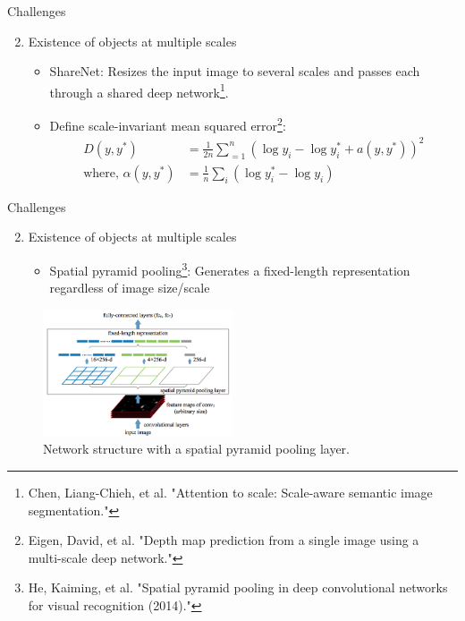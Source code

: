 \documentclass{beamer}
\begin{document}
\begin{frame}{Challenges}
\begin{enumerate}
	\setcounter{enumi}{1}
	\item {\color{blue}Existence of objects at multiple scales}
\begin{itemize}
	\item{ShareNet: Resizes the input image to several scales and passes each through a shared deep network\footnote{Chen, Liang-Chieh, et al. "Attention to scale: Scale-aware semantic image segmentation."}.}	
	\item<2->{Define scale-invariant mean squared error\footnote{Eigen, David, et al. "Depth map prediction from a single image using a\\ multi-scale deep network."}:}
	\begin{align*}
	D(y,y^{*})	&= \frac{1}{2n}\sum_{=1}^{n}\left( \log{y_i}-\log{y_{i}^{*}}+a(y,y^{*})\right)^2 \\
	\text{where, } \alpha(y,y^{*}) &= \frac{1}{n}\sum_{i}\left( \log{y_{i}^{*}}-\log{y_i}\right)
	\end{align*}
\end{itemize}
	\end{enumerate}
\end{frame}

\begin{frame}{Challenges}
\begin{enumerate}
	\setcounter{enumi}{1}
	\item {\color{blue}Existence of objects at multiple scales}
	\begin{itemize}
		\item{Spatial pyramid pooling\footnote{He, Kaiming, et al. "Spatial pyramid pooling in deep convolutional networks for visual recognition (2014)."}: Generates a fixed-length representation regardless of image size/scale}			
	\end{itemize}
\end{enumerate}
\begin{figure}
	\centering
	\includegraphics[width=0.5\textwidth]{figure/ss17.png}
	\captionsetup{justification=centering}
	\caption{Network structure with a spatial pyramid pooling layer.}	
\end{figure}
\end{frame}
\end{document}
